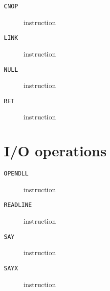 \clearpage
\begin{description}
\item[\texttt{CNOP}] instruction\\

\end{description}
\clearpage
\begin{description}
\item[\texttt{LINK}] instruction\\

\end{description}
\clearpage
\begin{description}
\item[\texttt{NULL}] instruction\\

\end{description}
\clearpage
\begin{description}
\item[\texttt{RET}] instruction\\

\end{description}
\clearpage
\section{I/O operations}
\begin{description}
\item[\texttt{OPENDLL}] instruction\\

\end{description}
\clearpage
\begin{description}
\item[\texttt{READLINE}] instruction\\

\end{description}
\clearpage
\begin{description}
\item[\texttt{SAY}] instruction\\

\end{description}
\clearpage
\begin{description}
\item[\texttt{SAYX}] instruction\\

\end{description}
\clearpage
